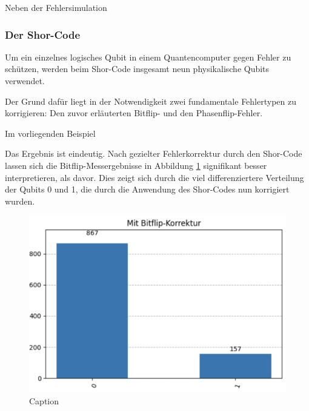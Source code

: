 Neben der Fehlersimulation 

\subsubsection{Der Shor-Code}
Um ein einzelnes logisches Qubit in einem Quantencomputer gegen Fehler zu schützen, werden beim Shor-Code insgesamt neun physikalische Qubits verwendet.

Der Grund dafür liegt in der Notwendigkeit zwei fundamentale Fehlertypen zu korrigieren: Den zuvor erläuterten Bitflip- und den Phasenflip-Fehler.

Im vorliegenden Beispiel    



Das Ergebnis ist eindeutig. Nach gezielter Fehlerkorrektur durch den Shor-Code lassen sich die Bitflip-Messergebnisse in Abbildung \ref{fig:with-error-correction} signifikant besser interpretieren, als davor. Dies zeigt sich durch die viel differenziertere Verteilung der Qubits 0 und 1, die durch die Anwendung des Shor-Codes nun korrigiert wurden.




\begin{figure}
    \centering
    \includegraphics[width=0.75\linewidth]{images/praxis-example/result_w_ec.png}
    \caption{Caption}
    \label{fig:with-error-correction}
\end{figure}



\printbibliography
